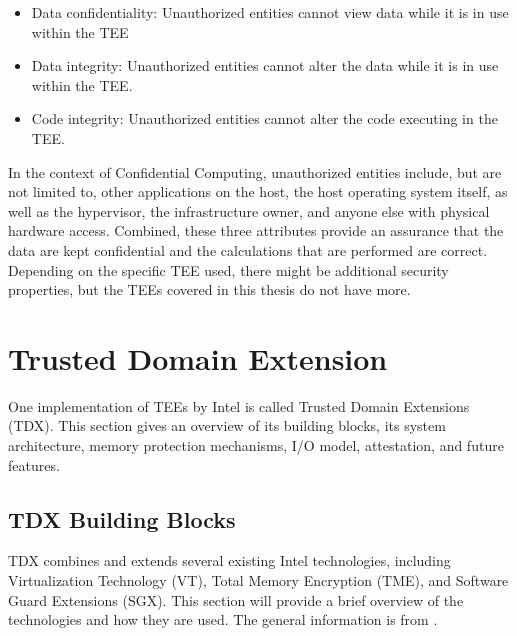 \begin{itemize} 
    \item \guillemotright Data confidentiality: Unauthorized entities cannot view data while it is in use within the TEE
    \item Data integrity: Unauthorized entities cannot alter the data while it is in use within the TEE.
    \item Code integrity: Unauthorized entities cannot alter the code executing in the TEE.\guillemotleft \cite{ccc_outreach_whitepaper_updated_november_2022pdf_2023}
\end{itemize} 
In the context of Confidential Computing, unauthorized entities include, but are not limited to, other applications on the host, the host operating system itself, as well as the hypervisor, the infrastructure owner, and anyone else with physical hardware access. 
Combined, these three attributes provide an assurance that the data are kept confidential and the calculations that are performed are correct.
Depending on the specific TEE used, there might be additional security properties, but the TEEs covered in this thesis do not have more\cite{ccc_outreach_whitepaper_updated_november_2022pdf_2023}.
\section{Trusted Domain Extension}
One implementation of TEEs by Intel is called Trusted Domain Extensions (TDX). This section gives an overview of its building blocks, its system architecture, memory protection mechanisms, I/O model, attestation, and future features.
\subsection{TDX Building Blocks}
\label{sec:tdxBuildingBlocks}
TDX combines and extends several existing Intel technologies, including Virtualization Technology (VT), Total Memory Encryption (TME), and Software Guard Extensions (SGX). This section will provide a brief overview of the technologies and how they are used. The general information is from \cite{cheng_intel_tdx_demystified_2023}.
